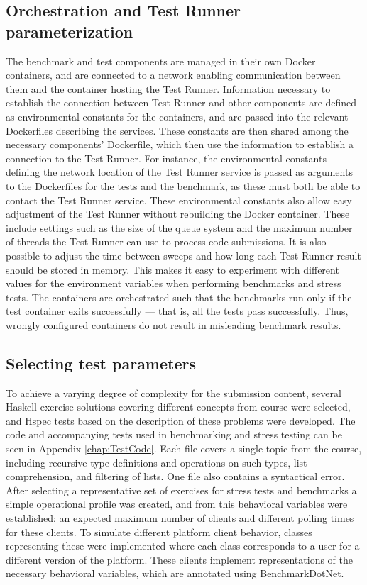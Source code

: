 \subsection{Orchestration and Test Runner parameterization}
The benchmark and test components are managed in their own Docker containers, and are connected to a network enabling communication between them and the container hosting the Test Runner.
Information necessary to establish the connection between Test Runner and other components are defined as environmental constants for the containers, and are passed into the relevant Dockerfiles describing the services.
These constants are then shared among the necessary components' Dockerfile, which then use the information to establish a connection to the Test Runner.
For instance, the environmental constants defining the network location of the Test Runner service is passed as arguments to the Dockerfiles for the tests and the benchmark, as these must both be able to contact the Test Runner service.
These environmental constants also allow easy adjustment of the Test Runner without rebuilding the Docker container.
These include settings such as the size of the queue system and the maximum number of threads the Test Runner can use to process code submissions.
It is also possible to adjust the time between sweeps and how long each Test Runner result should be stored in memory.
This makes it easy to experiment with different values for the environment variables when performing benchmarks and stress tests.
The containers are orchestrated such that the benchmarks run only if the test container exits successfully --- that is, all the tests pass successfully.
Thus, wrongly configured containers do not result in misleading benchmark results.

\subsection{Selecting test parameters}
To achieve a varying degree of complexity for the submission content, several Haskell exercise solutions covering different concepts from course were selected, and Hspec tests based on the description of these problems were developed.
The code and accompanying tests used in benchmarking and stress testing can be seen in Appendix \ref{chap:TestCode}.
Each file covers a single topic from the course, including recursive type definitions and operations on such types, list comprehension, and filtering of lists.
One file also contains a syntactical error.
After selecting a representative set of exercises for stress tests and benchmarks a simple operational profile was created, and from this behavioral variables were established: an expected maximum number of clients and different polling times for these clients.
To simulate different platform client behavior, classes representing these were implemented where each class corresponds to a user for a different version of the platform.
These clients implement representations of the necessary behavioral variables, which are annotated using BenchmarkDotNet.

